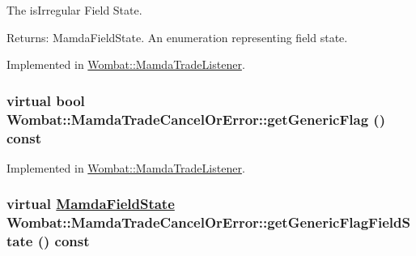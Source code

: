 The is\-Irregular Field State. 

\begin{Desc}
\item[Returns:]Mamda\-Field\-State. An enumeration representing field state. \end{Desc}


Implemented in \hyperlink{classWombat_1_1MamdaTradeListener_f8e874c8dc039fb83f1e9f4a8bdcbc6f}{Wombat::Mamda\-Trade\-Listener}.\hypertarget{classWombat_1_1MamdaTradeCancelOrError_5ce3c13612b7670f2517b21d4541c39e}{
\subsubsection[getGenericFlag]{\setlength{\rightskip}{0pt plus 5cm}virtual bool Wombat::Mamda\-Trade\-Cancel\-Or\-Error::get\-Generic\-Flag () const}}
\label{classWombat_1_1MamdaTradeCancelOrError_5ce3c13612b7670f2517b21d4541c39e}




Implemented in \hyperlink{classWombat_1_1MamdaTradeListener_f6591781ca46aa1392877bbf12c9e2f5}{Wombat::Mamda\-Trade\-Listener}.\hypertarget{classWombat_1_1MamdaTradeCancelOrError_dcb98107626628f22341cccc440b54e0}{
\subsubsection[getGenericFlagFieldState]{\setlength{\rightskip}{0pt plus 5cm}virtual \hyperlink{namespaceWombat_93aac974f2ab713554fd12a1fa3b7d2a}{Mamda\-Field\-State} Wombat::Mamda\-Trade\-Cancel\-Or\-Error::get\-Generic\-Flag\-Field\-State () const}}
\label{classWombat_1_1MamdaTradeCancelOrError_dcb98107626628f22341cccc440b54e0}




